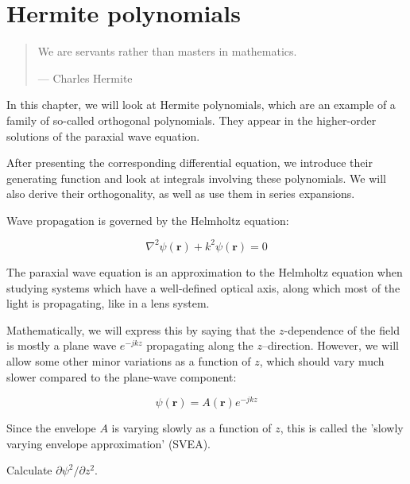 \chapter{Hermite polynomials}
\label{h:hermite}

\begin{quote}
We are servants rather than masters in mathematics.

--- Charles Hermite
\end{quote}

\chaptertoc

In this chapter, we will look at Hermite polynomials, which are an example of a family of so-called orthogonal polynomials. They appear in the higher-order solutions of the paraxial wave equation.

After presenting the corresponding differential equation, we introduce their generating function and look at integrals involving these polynomials. We will also derive their orthogonality, as well as use them in series expansions.

\pagebreak


Wave propagation is governed by the Helmholtz equation:

\begin{equation}
\nabla^2 \psi({\mathbf r}) + k^2 \psi({\mathbf r}) = 0
\end{equation}

The paraxial wave equation is an approximation to the Helmholtz equation when studying systems which have a well-defined optical axis, along which most of the light is propagating, like in a lens system.

Mathematically, we will express this by saying that the $z$-dependence of the field is mostly a plane wave $e^{-jkz}$ propagating along the $z$--direction. However, we will allow some other minor variations as a function of $z$, which should vary much slower compared to the plane-wave component:

\begin{equation}
\psi({\mathbf r}) = A({\mathbf r})e^{-jkz}
\label{eq-svea-ansatz}
\end{equation}

Since the envelope $A$ is varying slowly as a function of $z$, this is called the 'slowly varying envelope approximation' (SVEA).

\begin{cue}
Calculate $\partial \psi^2 / \partial z^2$.
\end{cue}

